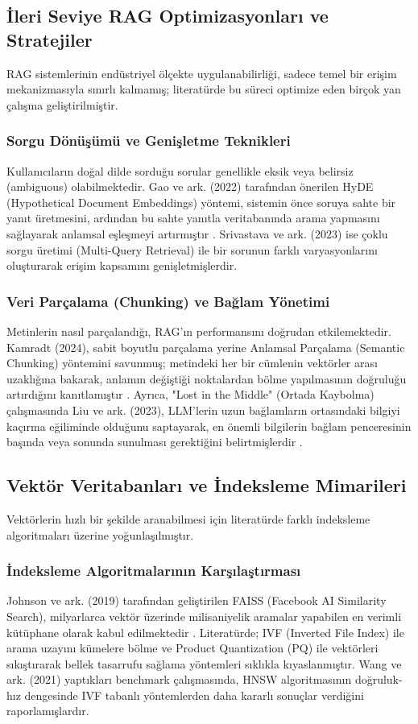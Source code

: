 \documentclass[12pt,a4paper]{report}
\begin{document}
\subsection{İleri Seviye RAG Optimizasyonları ve Stratejiler}
RAG sistemlerinin endüstriyel ölçekte uygulanabilirliği, sadece temel bir erişim mekanizmasıyla sınırlı kalmamış; literatürde bu süreci optimize eden birçok yan çalışma geliştirilmiştir.

\subsubsection{Sorgu Dönüşümü ve Genişletme Teknikleri}
Kullanıcıların doğal dilde sorduğu sorular genellikle eksik veya belirsiz (ambiguous) olabilmektedir. Gao ve ark. (2022) tarafından önerilen HyDE (Hypothetical Document Embeddings) yöntemi, sistemin önce soruya sahte bir yanıt üretmesini, ardından bu sahte yanıtla veritabanında arama yapmasını sağlayarak anlamsal eşleşmeyi artırmıştır \cite{gao2022precise}. Srivastava ve ark. (2023) ise çoklu sorgu üretimi (Multi-Query Retrieval) ile bir sorunun farklı varyasyonlarını oluşturarak erişim kapsamını genişletmişlerdir.

\subsubsection{Veri Parçalama (Chunking) ve Bağlam Yönetimi}
Metinlerin nasıl parçalandığı, RAG'ın performansını doğrudan etkilemektedir. Kamradt (2024), sabit boyutlu parçalama yerine Anlamsal Parçalama (Semantic Chunking) yöntemini savunmuş; metindeki her bir cümlenin vektörler arası uzaklığına bakarak, anlamın değiştiği noktalardan bölme yapılmasının doğruluğu artırdığını kanıtlamıştır \cite{kamradt2024semantic}. Ayrıca, "Lost in the Middle" (Ortada Kaybolma) çalışmasında Liu ve ark. (2023), LLM'lerin uzun bağlamların ortasındaki bilgiyi kaçırma eğiliminde olduğunu saptayarak, en önemli bilgilerin bağlam penceresinin başında veya sonunda sunulması gerektiğini belirtmişlerdir \cite{liu2023lost}.

\subsection{Vektör Veritabanları ve İndeksleme Mimarileri}
Vektörlerin hızlı bir şekilde aranabilmesi için literatürde farklı indeksleme algoritmaları üzerine yoğunlaşılmıştır.

\subsubsection{İndeksleme Algoritmalarının Karşılaştırması}
Johnson ve ark. (2019) tarafından geliştirilen FAISS (Facebook AI Similarity Search), milyarlarca vektör üzerinde milisaniyelik aramalar yapabilen en verimli kütüphane olarak kabul edilmektedir \cite{johnson2019billion}. Literatürde; IVF (Inverted File Index) ile arama uzayını kümelere bölme ve Product Quantization (PQ) ile vektörleri sıkıştırarak bellek tasarrufu sağlama yöntemleri sıklıkla kıyaslanmıştır. Wang ve ark. (2021) yaptıkları benchmark çalışmasında, HNSW algoritmasının doğruluk-hız dengesinde IVF tabanlı yöntemlerden daha kararlı sonuçlar verdiğini raporlamışlardır.
\end{document}
